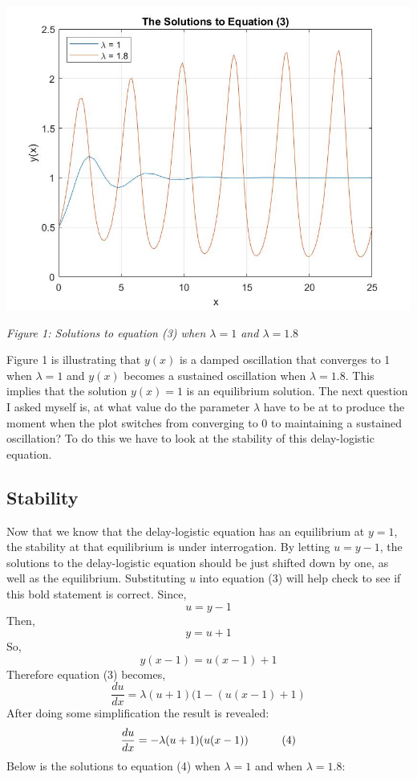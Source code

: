 \documentclass{article}
\begin{document}
\bigskip
\begin{center}
\includegraphics[width=15cm]{Solutions.jpg}

\textit{Figure 1: Solutions to equation (3) when $\lambda = 1$ and $\lambda = 1.8$}

\end{center}
\bigskip
Figure 1 is illustrating that $y(x)$ is a damped oscillation that converges to 1 when $\lambda = 1$ and $y(x)$ becomes a sustained oscillation when $\lambda = 1.8$. This implies that the solution $y(x) = 1$ is an equilibrium solution. The next question I asked myself is, at what value do the parameter $\lambda$ have to be at to produce the moment when the plot switches from converging to $0$ to maintaining a sustained oscillation? To do this we have to look at the stability of this delay-logistic equation.

\subsection{Stability}
\indent \indent Now that we know that the delay-logistic equation has an equilibrium at $y=1$, the stability at that equilibrium is under interrogation. By letting $u = y - 1$, the solutions to the  delay-logistic equation should be just shifted down by one, as well as the equilibrium. Substituting $u$ into equation (3) will help check to see if this bold statement is correct.
\newline Since, $$u = y-1$$
Then, $$y =  u+1$$
So, $$y(x-1) = u(x-1)+1$$
Therefore equation (3) becomes, $$\frac{du}{dx} = \lambda (u+1) (1-(u(x-1)+1)$$
After doing some simplification the result is revealed:
$$\frac{du}{dx} = -\lambda (u+1) (u(x-1))\indent\indent (4) $$
Below is the solutions to equation (4) when $\lambda = 1$ and when $\lambda = 1.8$:
\end{document}
